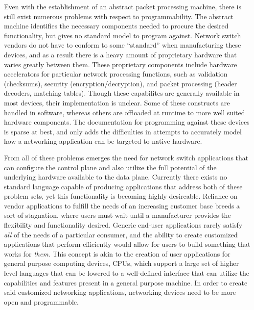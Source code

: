 Even with the establishment of an abstract packet processing machine, there
is still exist numerous problems with respect to programmability. The abstract 
machine identifies the necessary components needed to procure the desired 
functionality, but gives no standard model to program against. Network switch
vendors do not have to conform to some ``standard'' when manufacturing these
devices, and as a result there is a heavy amount of proprietary hardware that
varies greatly between them. These proprietary components include hardware 
accelerators for particular network processing functions, such as validation 
(checksums), security (encryption/decryption), and packet processing (header
decoders, matching tables). Though these capabilites are generally available
in most devices, their implementation is unclear. Some of these constructs are
handled in software, whereas others are offloaded at runtime to more well
suited hardware components. The documentation for programming against these
devices is sparse at best, and only adds the difficulties in attempts to
accurately model how a networking application can be targeted to native
hardware.

From all of these problems emerges the need for network switch applications
that can configure the control plane and also utilize the full potential of 
the underlying hardware available to the data plane. Currently there exists
no standard language capable of producing applications that address both of
these problem sets, yet this functionality is becoming highly desireable.
Reliance on vendor applications to fulfill the needs of an increasing customer
base breeds a sort of stagnation, where users must wait until a manufacturer
provides the flexibility and functionality desired. Generic end-user
applications rarely satisfy \emph{all} of the needs of a particular consumer, 
and the ability to create customized applications that perform efficiently 
would allow for users to build something that works for \emph{them}. This 
concept is akin to the creation of user applications for general purpose 
computing devices, CPUs, which support a large set of higher level languages 
that can be lowered to a well-defined interface that can utilize the 
capabilities and features present in a general purpose machine. In order to
create said customized networking applications, networking devices need to be
more open and programmable.

